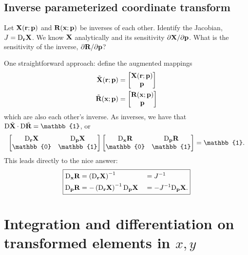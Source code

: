 \subsection{Inverse parameterized coordinate transform}

Let $\textbf{X}(\textbf{r}; \textbf{p})$ and $\textbf{R}(\textbf{x}; \textbf{p})$ be inverses of each other.  
Identify the Jacobian, $J = \text{D}_{\textbf{r}} \textbf{X}$.  We know $\textbf{X}$ analytically and its sensitivity $\partial{\textbf{X}}/\partial{\textbf{p}}$.  What is the sensitivity of the inverse, $\partial{\textbf{R}}/\partial{\textbf{p}}$?

One straightforward approach: define the augmented mappings
%
\begin{equation}
\begin{aligned}
\tilde{\textbf{X}}(\textbf{r}; \textbf{p}) &= \begin{bmatrix} \textbf{X}(\textbf{r}; \textbf{p}) \\ \textbf{p} \end{bmatrix} \\
\tilde{\textbf{R}}(\textbf{x}; \textbf{p}) &= \begin{bmatrix} \textbf{R}(\textbf{x}; \textbf{p}) \\ \textbf{p} \end{bmatrix}
\end{aligned}
\end{equation}
%
which are also each other's inverse.  As inverses, we have that $\D \tilde{\ve X} \cdot \D \tilde{\ve R} = \mathbb{1}$, or
%
\begin{equation}
\begin{bmatrix} \D_{\ve r} \ve X & \D_{\ve p} \ve X \\ \mathbb{0} & \mathbb{1} \end{bmatrix}
\begin{bmatrix} \D_{\ve x} \ve R & \D_{\ve p} \ve R \\ \mathbb{0} & \mathbb{1} \end{bmatrix}
= \mathbb{1}.
\end{equation}
%
This leads directly to the nice answer:
%
\begin{equation}
\boxed{
\begin{aligned}
\text{D}_{\textbf{x}} \textbf{R} &= \left( \text{D}_{\textbf{r}} \textbf{X} \right)^{-1} &&= J^{-1}\\
\text{D}_{\textbf{p}} \textbf{R} &= - \left( \text{D}_{\textbf{r}} \textbf{X} \right)^{-1} \text{D}_{\textbf{p}} \textbf{X} &&= -J^{-1} \text{D}_{\textbf{p}} \textbf{X}.
\end{aligned}
}
\end{equation}

\section{Integration and differentiation on transformed elements in $x,y$}

